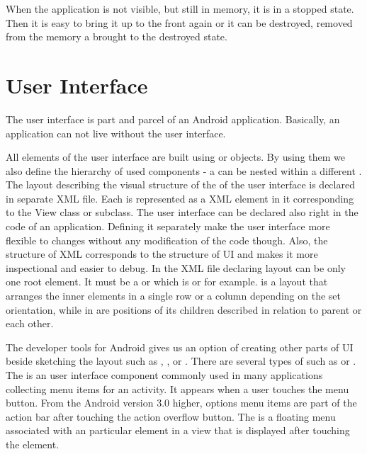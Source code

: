When the application is not visible, but still in memory, it is in a stopped state.
Then it is easy to bring it up to the front again or it can be destroyed, removed from the memory a brought to the destroyed state.


\section{User Interface}

The user interface is part and parcel of an Android application.
Basically, an application can not live without the user interface.

All elements of the user interface are built using  or  objects.
By using them we also define the hierarchy of used components - a  can be nested within a different .
The layout describing the visual structure of the  of the user interface is declared in separate XML file.
Each  is represented as a XML element in it corresponding to the View class or subclass.
The user interface can be declared also right in the code of an application. 
Defining it separately make the user interface more flexible to changes without any modification of the code though.
Also, the structure of XML corresponds to the structure of UI and makes it more inspectional and easier to debug.
In the XML file declaring layout can be only one root element. 
It must be a  or  which is  or  for example.
 is a layout that arranges the inner elements in a single row or a column depending on the set orientation, 
while in  are positions of its children described in relation to parent or each other.

The developer tools for Android gives us an option of creating other parts of UI beside sketching the layout such as , ,  or .
There are several types of  such as  or .
The  is an user interface component commonly used in many applications collecting menu items for an activity.
It appears when a user touches the menu button.
From the Android version 3\@.0 higher, options menu items are part of the action bar after touching the action overflow button.
The  is a floating menu associated with an particular element in a view that is displayed after touching the element.

